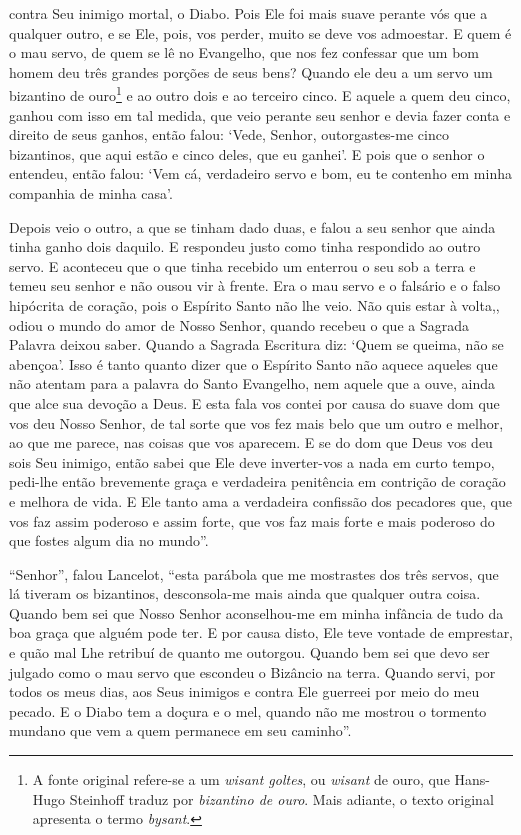contra Seu inimigo mortal, o Diabo. Pois Ele foi mais suave perante vós que a
qualquer outro, e se Ele, pois, vos perder, muito se deve vos admoestar. E quem
é o mau servo, de quem se lê no Evangelho, que nos fez confessar que um bom
homem deu três grandes porções de seus bens? Quando ele deu a um servo um
bizantino de ouro\footnote{ A fonte original refere-se a um \textit{wisant
goltes}, ou \textit{wisant} de ouro, que Hans-Hugo Steinhoff traduz por
\textit{bizantino de ouro}. Mais adiante, o texto original apresenta o termo
\textit{bysant}.} e ao outro dois e ao terceiro cinco. E aquele a
quem deu cinco, ganhou com isso em tal medida, que veio perante seu senhor e
devia fazer conta e direito de seus ganhos, então falou: ‘Vede, Senhor,
outorgastes-me cinco bizantinos, que aqui estão e cinco deles, que eu ganhei’.
E pois que o senhor o entendeu, então falou: ‘Vem cá, verdadeiro servo e bom,
eu te contenho em minha companhia de minha casa’. 

Depois veio o outro, a que se tinham dado duas, e falou a seu senhor que ainda
tinha ganho dois daquilo. E respondeu justo como tinha respondido ao outro
servo. E aconteceu que o que tinha recebido um enterrou o seu sob a terra e
temeu seu senhor e não ousou vir à frente. Era o mau servo e o falsário e o
falso hipócrita de coração, pois o Espírito Santo não lhe veio. Não quis estar
à volta,, odiou o mundo do amor de Nosso Senhor, quando recebeu o que a Sagrada
Palavra deixou saber. Quando a Sagrada Escritura diz: ‘Quem se queima, não se
abençoa’. Isso é tanto quanto dizer que o Espírito Santo não aquece aqueles que
não atentam para a palavra do Santo Evangelho, nem aquele que a ouve, ainda que
alce sua devoção a Deus. E esta fala vos contei por causa do suave dom que vos
deu Nosso Senhor, de tal sorte que vos fez mais belo que um outro e melhor, ao
que me parece, nas coisas que vos aparecem. E se do dom que Deus vos deu sois
Seu inimigo, então sabei que Ele deve inverter-vos a nada em curto tempo,
pedi-lhe então brevemente graça e verdadeira penitência em contrição de coração
e melhora de vida. E Ele tanto ama a verdadeira confissão dos pecadores que,
que vos faz assim poderoso e assim forte, que vos faz mais forte e mais
poderoso do que fostes algum dia no mundo”.  

“Senhor”, falou Lancelot, “esta parábola que me mostrastes dos três servos, que
lá tiveram os bizantinos, desconsola-me mais ainda que qualquer outra coisa.
Quando bem sei que Nosso Senhor aconselhou-me em minha infância de tudo da boa
graça que alguém pode ter. E por causa disto, Ele teve vontade de emprestar, e
quão mal Lhe retribuí de quanto me outorgou. Quando bem sei que devo ser
julgado como o mau servo que escondeu o Bizâncio na terra. Quando servi, por
todos os meus dias, aos Seus inimigos e contra Ele guerreei por meio do meu
pecado. E o Diabo tem a doçura e o mel, quando não me mostrou o tormento
mundano que vem a quem permanece em seu caminho”. 

